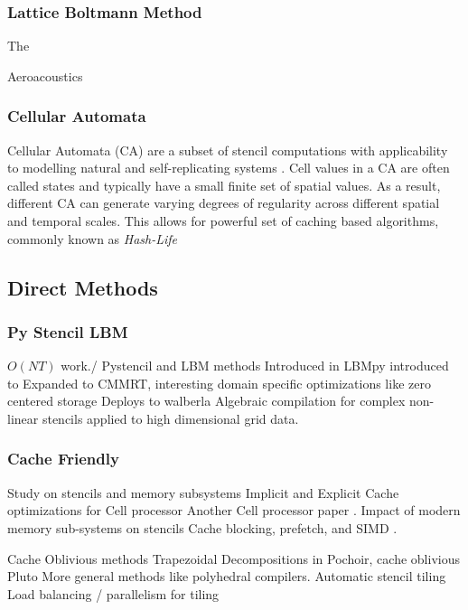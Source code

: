 \subsubsection{Lattice Boltmann Method}

The

Aeroacoustics \cite{Casalino2014LBM}

\subsubsection{Cellular Automata}

Cellular Automata (CA) are a subset of stencil computations
with applicability to modelling natural and self-replicating systems \cite{Mendicino2015Eco, Caux2010HashLife, Sitko2016Cellular, Wolfram1984Cellular, Kyparissas2020Cellular}.
Cell values in a CA are often called states 
and typically have a small finite set of spatial values.  
As a result, different CA can generate varying degrees of regularity 
across different spatial and temporal scales.
This allows for powerful set of caching based algorithms, 
commonly known as \textit{Hash-Life}  \cite{Gosper1984HashLife}



\subsection{Direct Methods}

\subsubsection{Py Stencil LBM}
\begin{outline}
\1 $O(NT)$ work./
\1 Pystencil and LBM methods
\2 Introduced in \cite{Bauer2019PhaseField}
\2 LBMpy introduced to \cite{Bauer2021lbmpy}
\2 Expanded to CMMRT, interesting domain specific optimizations like zero centered storage \cite{Hennig2023CMMRT}
\2 Deploys to walberla \cite{Bauer2021walberla}
\2 Algebraic compilation for complex non-linear stencils applied to high dimensional grid data.
\end{outline}

\subsubsection{Cache Friendly}
\begin{outline}
  \1 Study on stencils and memory subsystems \cite{Datta2009Stencil}
  \1 Implicit and Explicit Cache optimizations for Cell processor \cite{Kamil2006Stencil} 
  \1 Another Cell processor paper \cite{DeLaCruz2010Stencil}.
  \1 Impact of modern memory sub-systems on stencils \cite{Kamil2005Stencil}
  \1 Cache blocking, prefetch, and SIMD \cite{Dursun2009Core}.

\1 Cache Oblivious methods
\2 Trapezoidal Decompositions in Pochoir, cache oblivious \cite{Frigo2005Stencil, Tang2011Pochoir}
\1 Pluto \cite{Bondhugula2008Automatic, Bondhugula2008Practical}
\1 More general methods like polyhedral compilers. 
\1 Automatic stencil tiling \cite{Li2004Tiling}
\1 Load balancing / parallelism for tiling \cite{Krishnamoorthy2007Tiling}
\end{outline}

